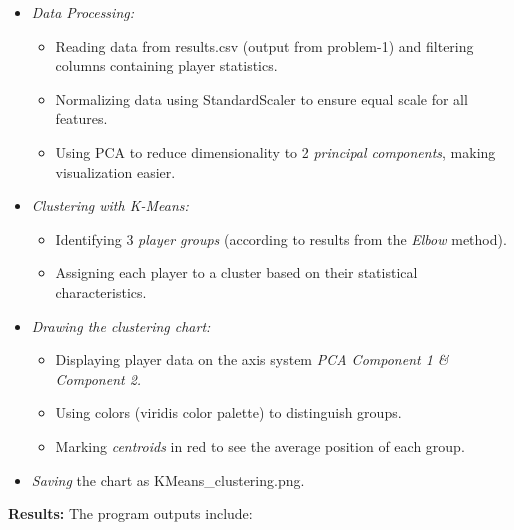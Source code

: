 \documentclass[12pt]{article}
\begin{document}
\begin{itemize}
    \item \textit{Data Processing:}
    
    \begin{itemize}
        \item Reading data from results.csv (output from problem-1) and filtering columns containing player statistics.
        \item Normalizing data using StandardScaler to ensure equal scale for all features.
        \item Using PCA to reduce dimensionality to 2 \textit{principal components}, making visualization easier.
    \end{itemize}
    
    \item \textit{Clustering with K-Means:}
    
    \begin{itemize}
        \item Identifying 3 \textit{player groups} (according to results from the \textit{Elbow} method).
        \item Assigning each player to a cluster based on their statistical characteristics.
    \end{itemize}
    
    \item \textit{Drawing the clustering chart:}
    
    \begin{itemize}
        \item Displaying player data on the axis system \textit{PCA Component 1 \& Component 2.}
        \item Using colors (viridis color palette) to distinguish groups.
        \item Marking \textit{centroids} in red to see the average position of each group.
    \end{itemize}
    
    \item \textit{Saving} the chart as KMeans\_clustering.png.
    
\end{itemize}
\textbf{Results:} The program outputs include:
\end{document}
